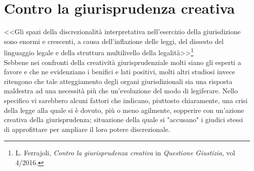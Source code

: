 \section{Contro la giurisprudenza creativa}%
<<Gli spazi della discrezionalità interpretativa nell’esercizio della giurisdizione sono enormi e crescenti, a causa dell’inflazione delle leggi, del dissesto del linguaggio legale e della struttura multilivello della legalità>>\footnote{L. Ferrajoli, \textit{Contro la giurisprudenza creativa} in \textit{Questione Giustizia}, vol 4/2016.}
\\Sebbene nei confronti della creatività giurisprudenziale molti siano gli esperti a favore e che ne evidenziano i benifici e lati positivi, molti altri studiosi invece ritengono che tale atteggiamento degli organi giurisdizionali sia una risposta maldestra ad una necessità più che un'evoluzione del modo di legiferare. Nello specifico vi sarebbero alcuni fattori che indicano, piuttosto chiaramente, una crisi della legge alla quale si è dovuto, più o meno agilmente, sopperire con un'azione creativa della giurisprudenza; situazione della quale si "accusano" i giudici stessi di approfittare per ampliare il loro potere discrezionale.


